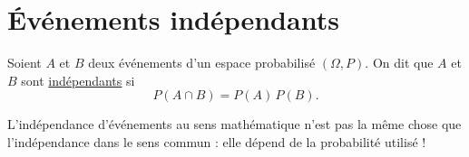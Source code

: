 \part{Événements indépendants}

\begin{defn}
	Soient $A$ et $B$ deux événements d'un espace probabilisé $(\Omega, P)$.
	On dit que $A$ et $B$ sont \underline{indépendants}  si \[
		P(A \cap B) = P(A)\,P(B).
	\]
\end{defn}

\begin{rmk}
	L'indépendance d'événements au sens mathématique n'est pas la même chose que l'indépendance dans le sens commun : elle dépend de la probabilité utilisé !
\end{rmk}

